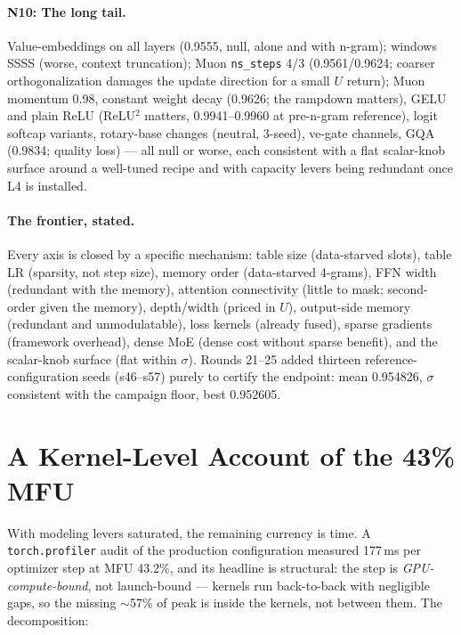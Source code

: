 \documentclass{article}
\begin{document}
\paragraph{N10: The long tail.}
Value-embeddings on all layers (0.9555, null, alone and with n-gram); windows SSSS (worse, context truncation); Muon \texttt{ns\_steps} 4/3 (0.9561/0.9624; coarser orthogonalization damages the update direction for a small $U$ return); Muon momentum 0.98, constant weight decay (0.9626; the rampdown matters), GELU and plain ReLU (ReLU$^2$ matters, 0.9941--0.9960 at pre-n-gram reference), logit softcap variants, rotary-base changes (neutral, 3-seed), ve-gate channels, GQA (0.9834; quality loss) --- all null or worse, each consistent with a flat scalar-knob surface around a well-tuned recipe and with capacity levers being redundant once L4 is installed.

\paragraph{The frontier, stated.} Every axis is closed by a specific mechanism: table size (data-starved slots), table LR (sparsity, not step size), memory order (data-starved 4-grams), FFN width (redundant with the memory), attention connectivity (little to mask; second-order given the memory), depth/width (priced in $U$), output-side memory (redundant and unmodulatable), loss kernels (already fused), sparse gradients (framework overhead), dense MoE (dense cost without sparse benefit), and the scalar-knob surface (flat within $\sigma$). Rounds 21--25 added thirteen reference-configuration seeds (s46--s57) purely to certify the endpoint: mean 0.954826, $\sigma$ consistent with the campaign floor, best 0.952605.

\section{A Kernel-Level Account of the 43\% MFU}
\label{sec:kernel}

With modeling levers saturated, the remaining currency is time. A \texttt{torch.profiler} audit of the production configuration measured 177\,ms per optimizer step at MFU 43.2\%, and its headline is structural: the step is \emph{GPU-compute-bound}, not launch-bound --- kernels run back-to-back with negligible gaps, so the missing $\sim$57\% of peak is inside the kernels, not between them. The decomposition:
\end{document}

